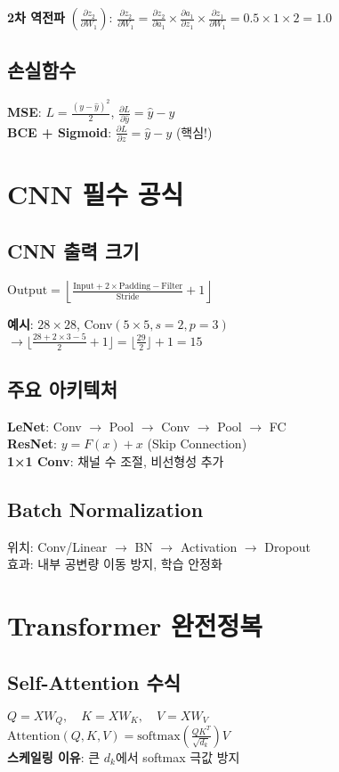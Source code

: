 \documentclass[6pt,landscape,a4paper]{article}
\begin{document}
\begin{multicols}{3}
\textbf{2차 역전파} $(\frac{\partial z_2}{\partial W_1})$:
$\frac{\partial z_2}{\partial W_1} = \frac{\partial z_2}{\partial a_1} \times \frac{\partial a_1}{\partial z_1} \times \frac{\partial z_1}{\partial W_1} = 0.5 \times 1 \times 2 = 1.0$

\subsection{손실함수}
\textbf{MSE}: $L = \frac{(y-\hat{y})^2}{2}$, $\frac{\partial L}{\partial \hat{y}} = \hat{y}-y$\\
\textbf{BCE + Sigmoid}: $\frac{\partial L}{\partial z} = \hat{y}-y$ (핵심!)

\section{CNN 필수 공식}
\subsection{CNN 출력 크기}
$\text{Output} = \left\lfloor \frac{\text{Input} + 2 \times \text{Padding} - \text{Filter}}{\text{Stride}} + 1 \right\rfloor$

\textbf{예시}: $28 \times 28$, Conv$(5 \times 5, s=2, p=3)$\\
$\rightarrow \lfloor \frac{28 + 2 \times 3 - 5}{2} + 1 \rfloor = \lfloor \frac{29}{2} \rfloor + 1 = 15$
\subsection{주요 아키텍처}
\textbf{LeNet}: Conv $\rightarrow$ Pool $\rightarrow$ Conv $\rightarrow$ Pool $\rightarrow$ FC\\
\textbf{ResNet}: $y = F(x) + x$ (Skip Connection)\\
\textbf{1×1 Conv}: 채널 수 조절, 비선형성 추가
\subsection{Batch Normalization}
위치: Conv/Linear $\rightarrow$ BN $\rightarrow$ Activation $\rightarrow$ Dropout\\
효과: 내부 공변량 이동 방지, 학습 안정화
\section{Transformer 완전정복}
\subsection{Self-Attention 수식}
$Q = XW_Q, \quad K = XW_K, \quad V = XW_V$\\
$\text{Attention}(Q,K,V) = \text{softmax}\left(\frac{QK^T}{\sqrt{d_k}}\right)V$\\
\textbf{스케일링 이유}: 큰 $d_k$에서 softmax 극값 방지

\end{multicols}
\end{document}
